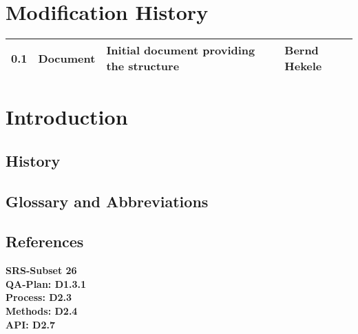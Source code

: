 \documentclass{template/openetcs_article}
\begin{document}
\maketitle



\section*{Modification History}
\begin{supertabular}{| m{1.2cm} | m{1.2cm} | m{6.6cm} | m{4cm} |}
0.1 & Document & Initial document providing the structure & Bernd Hekele \\\hline
\end{supertabular}


\tableofcontents
\listoffiguresandtables
\newpage





\section{Introduction}



\subsection{History}



\subsection{Glossary and Abbreviations}

\subsection{References}

\textbf{SRS-Subset 26}\\
\textbf{QA-Plan: D1.3.1}\\
\textbf{Process: D2.3}\\
\textbf{Methods: D2.4}\\
\textbf{API: D2.7}\\
\end{document}
